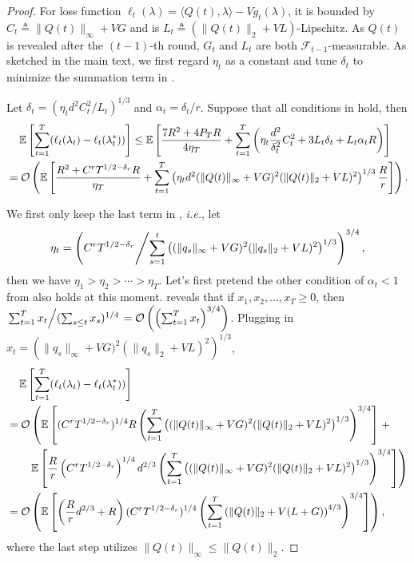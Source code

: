 \documentclass[11pt,fullpage,letterpaper]{article} %
\renewcommand{\bm}[1]{#1}%
\renewcommand{\O}{\operatorname{\mathcal O}}
\newcommand{\E}{\operatornamewithlimits{\mathbb{E}}}
\begin{document}
\begin{proof}
For loss function $\ell_t(\bm \lambda)=\langle \bm Q(t),\bm \lambda\rangle - Vg_t(\bm \lambda)$, it is bounded by $C_t\triangleq \lVert \bm Q(t)\rVert_\infty + V G$ and is $L_t\triangleq (\lVert \bm Q(t)\rVert_2 + VL)$-Lipschitz. As $\bm Q(t)$ is revealed after the $(t-1)$-th round, $G_t$ and $L_t$ are both $\mathcal F_{t-1}$-measurable.
As sketched in the main text, we first regard $\eta_t$ as a constant and tune $\delta_t$ to minimize the summation term in .

Let $\delta_t=(\eta_t d^2 C_t^2 / L_t)^{1/3}$ and $\alpha_t=\delta_t / r$. Suppose that all conditions in  hold, then
\begin{align}
&\quad \E\left [\sum_{t=1}^T (\ell_t(\bm \lambda_t)-\ell_t(\bm \lambda_t^\ast))\right ]\le \E\left [\frac{7R^2 + 4 P_T R}{4\eta_T} + \sum_{t=1}^T \left (\eta_t \frac{d^2}{\delta_t^2} C_t^2 + 3L_t\delta_t + L_t \alpha_t R\right )\right ] \nonumber\\
&=\O\left (\E\left [\frac{R^2 + C^r T^{1/2 - \delta_r} R}{\eta_T}+\sum_{t=1}^T \left (\eta_t d^2 (\lVert \bm Q(t)\rVert_\infty + VG)^2 (\lVert \bm Q(t)\rVert_2 + VL)^2\right )^{1/3} \frac{R}{r}\right ]\right ). \label{eq:BCO regret decomposition}
\end{align}

We first only keep the last term in , \textit{i.e.}, let
\begin{equation}\label{eq:learning rate in BCO}
\eta_t = \left (C^r T^{1/2 - \delta_r}\middle / \sum_{s=1}^t \left ((\lVert \bm q_s\rVert_\infty + VG)^2 (\lVert \bm q_s\rVert_2 + VL)^2\right )^{1/3}\right )^{3/4},
\end{equation}
then we have $\eta_1>\eta_2>\cdots >\eta_T$. Let's first pretend the other condition of $\alpha_t<1$ from  also holds at this moment.
 reveals that if $x_1,x_2,\ldots,x_T\ge 0$, then $\left .\sum_{t=1}^T x_t \middle / (\sum_{s\le t} x_s)^{1/4} \right . =\O\left (\left (\sum_{t=1}^T x_t\right )^{3/4}\right )$. Plugging in $x_t=\left (\lVert \bm q_s\rVert_\infty + VG)^2 (\lVert \bm q_s\rVert_2 + VL)^2\right )^{1/3}$,
\begin{align*}
&\quad \E\left [\sum_{t=1}^T (\ell_t(\bm \lambda_t)-\ell_t(\bm \lambda_t^\ast))\right ] \\
&=\O\left (\E\left [(C^r T^{1/2 - \delta_r})^{1/4} R \left (\sum_{t=1}^T \left ((\lVert \bm Q(t)\rVert_\infty + VG)^2 (\lVert \bm Q(t)\rVert_2 + VL)^2\right )^{1/3}\right )^{3/4} \right ]\right . + \\
&\qquad \left .\E\left [\frac{R}{r} \left (C^r T^{1/2 - \delta_r}\right )^{1/4} d^{2/3} \left (\sum_{t=1}^T \left ((\lVert \bm Q(t)\rVert_\infty + VG)^2 (\lVert \bm Q(t)\rVert_2 + VL)^2\right )^{1/3}\right )^{3/4} \right ] \right )\\
&=\O\left (\E\left [\left (\frac{R}{r} d^{2/3}+R\right ) (C^r T^{1/2 - \delta_r})^{1/4} \left (\sum_{t=1}^T \left (\lVert \bm Q(t)\rVert_2 + V(L+G)\right )^{4/3}\right )^{3/4}\right ]\right ),
\end{align*}
where the last step utilizes $\lVert \bm Q(t)\rVert_\infty \le \lVert \bm Q(t)\rVert_2$.


\end{proof}
\end{document}
